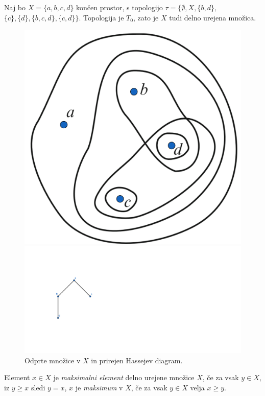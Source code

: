 \documentclass[mat1]{fmfdelo}
\begin{document}
\begin{primer}
    Naj bo $X=\{a,b,c,d\}$ končen prostor, s topologijo 
    $\tau=\{\emptyset,X,\{b,d\},$ $\{c\},\{d\},\{b,c,d\},
    \{c,d\}\}$. Topologija je $T_0$, zato je $X$ tudi delno 
    urejena množica.
\begin{figure}[h!]
    \centering
    \begin{minipage}{0.5\textwidth}
        \centering
        \includegraphics[width=0.6\linewidth]{open.png}
    \end{minipage}%
    \begin{minipage}{0.5\textwidth}
        \centering
        \includegraphics[width=2.5\linewidth]{hasse.png}
    \end{minipage}
    \caption{Odprte množice v $X$ in prirejen Hassejev diagram.}
\end{figure}


\end{primer}

\begin{definicija}
    Element $x\in X$ je \emph{maksimalni element} delno urejene množice $X$, če  za vsak $y \in X$, iz  $y\geq x$ sledi  $y = x$,
    $x$ je \emph{maksimum} v $X$, če za vsak $y \in X$ velja $x\geq y$.
\end{definicija}
\end{document}
